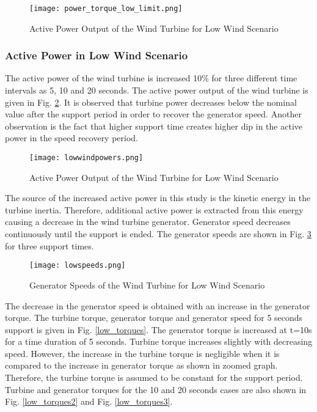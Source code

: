 \begin{figure}[h!]
	\centering
	\texttt{[image: power\_torque\_low\_limit.png]}
	\caption{Active Power Output of the Wind Turbine for Low Wind Scenario}
	\label{low_limit_power}
\end{figure}
\subsubsection{Active Power in Low Wind Scenario}
The active power of the wind turbine is increased 10\% for three different time intervals as 5, 10 and 20 seconds. The active power output of the wind turbine is given in Fig. \ref{lowactivepowers}. It is observed that turbine power decreases below the nominal value after the support period in order to recover the generator speed. Another observation is the fact that higher support time creates higher dip in the active power in the speed recovery period.\par
\begin{figure}[h!]
	\centering
	\texttt{[image: lowwindpowers.png]}
	\caption{Active Power Output of the Wind Turbine for Low Wind Scenario}
	\label{lowactivepowers}
\end{figure}
The source of the increased active power in this study is the kinetic energy in the turbine inertia. Therefore, additional active power is extracted from this energy causing a decrease in the wind turbine generator. Generator speed decreases continuously until the support is ended. The generator speeds are shown in Fig. \ref{low_speeds} for three support times.\par
\begin{figure}[h!]
	\centering
	\texttt{[image: lowspeeds.png]}
	\caption{Generator Speeds of the Wind Turbine for Low Wind Scenario}
	\label{low_speeds}
\end{figure}
The decrease in the generator speed is obtained with an increase in the generator torque. The turbine torque, generator torque and generator speed for 5 seconds support is given in Fig. \ref{low_torques}. The generator torque is increased at t=10s for a time duration of 5 seconds. Turbine torque increases slightly with decreasing speed. However, the increase in the turbine torque is negligible when it is compared to the increase in generator torque as shown in zoomed graph. Therefore, the turbine torque is assumed to be constant for the support period. Turbine and generator torques for the 10 and 20 seconds cases are also shown in Fig. \ref{low_torques2} and Fig. \ref{low_torques3}. 
